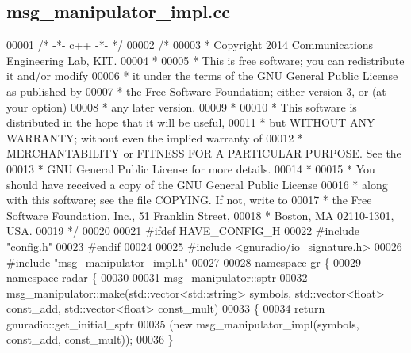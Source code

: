 \subsection{msg\+\_\+manipulator\+\_\+impl.\+cc}
\label{msg__manipulator__impl_8cc_source}

\begin{DoxyCode}
00001 \textcolor{comment}{/* -*- c++ -*- */}
00002 \textcolor{comment}{/* }
00003 \textcolor{comment}{ * Copyright 2014 Communications Engineering Lab, KIT.}
00004 \textcolor{comment}{ * }
00005 \textcolor{comment}{ * This is free software; you can redistribute it and/or modify}
00006 \textcolor{comment}{ * it under the terms of the GNU General Public License as published by}
00007 \textcolor{comment}{ * the Free Software Foundation; either version 3, or (at your option)}
00008 \textcolor{comment}{ * any later version.}
00009 \textcolor{comment}{ * }
00010 \textcolor{comment}{ * This software is distributed in the hope that it will be useful,}
00011 \textcolor{comment}{ * but WITHOUT ANY WARRANTY; without even the implied warranty of}
00012 \textcolor{comment}{ * MERCHANTABILITY or FITNESS FOR A PARTICULAR PURPOSE.  See the}
00013 \textcolor{comment}{ * GNU General Public License for more details.}
00014 \textcolor{comment}{ * }
00015 \textcolor{comment}{ * You should have received a copy of the GNU General Public License}
00016 \textcolor{comment}{ * along with this software; see the file COPYING.  If not, write to}
00017 \textcolor{comment}{ * the Free Software Foundation, Inc., 51 Franklin Street,}
00018 \textcolor{comment}{ * Boston, MA 02110-1301, USA.}
00019 \textcolor{comment}{ */}
00020 
00021 \textcolor{preprocessor}{#ifdef HAVE\_CONFIG\_H}
00022 \textcolor{preprocessor}{#include "config.h"}
00023 \textcolor{preprocessor}{#endif}
00024 
00025 \textcolor{preprocessor}{#include <gnuradio/io\_signature.h>}
00026 \textcolor{preprocessor}{#include "msg_manipulator_impl.h"}
00027 
00028 \textcolor{keyword}{namespace }gr \{
00029   \textcolor{keyword}{namespace }radar \{
00030 
00031     msg_manipulator::sptr
00032     msg_manipulator::make(std::vector<std::string> symbols, std::vector<float> const\_add, 
      std::vector<float> const\_mult)
00033     \{
00034       \textcolor{keywordflow}{return} gnuradio::get\_initial\_sptr
00035         (\textcolor{keyword}{new} msg_manipulator_impl(symbols, const\_add, const\_mult));
00036     \}

\end{DoxyCode}
